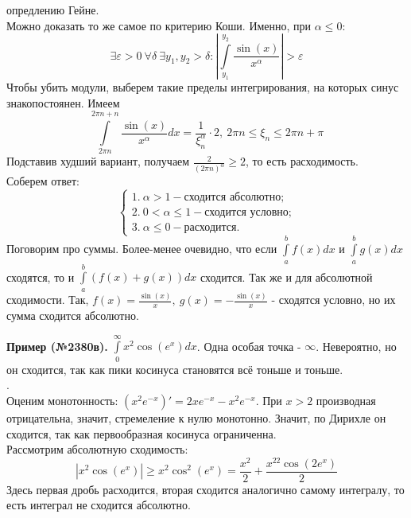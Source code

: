 опредлению Гейне.\\
Можно доказать то же самое по критерию Коши. Именно, при $\alpha\leqslant 0$:
$$\exists \varepsilon>0~\forall \delta~\exists y_1,y_2>\delta:
\left| \int\limits_{y_1}^{y_2} \frac{\sin(x)}{x^\alpha}\right|>
\varepsilon$$ 
Чтобы убить модули, выберем такие пределы интегрирования, на которых
синус знакопостоянен. Имеем 
$$\int\limits_{2\pi n}^{2\pi n+n} \frac{\sin(x)}{x^\alpha}dx=
\frac{1}{\xi^\alpha_n}\cdot 2,~2\pi n\leqslant \xi_n\leqslant 2\pi n+\pi$$
Подставив худший вариант, получаем $\frac{2}{(2\pi n)^\alpha}\geqslant 2$,
то есть расходимость.\\
Соберем ответ: 
$$\begin{cases}
    1.~ \alpha>1 - \text{сходится абсолютно;}\\
    2.~ 0<\alpha\leqslant 1 - \text{сходится условно;}\\
    3.~ \alpha\leqslant 0 - \text{расходится.}
\end{cases}$$
Поговорим про суммы. Более-менее очевидно, что если 
$\int\limits_{a}^{b}f(x)dx$ и $\int\limits_{a}^{b}g(x)dx$ сходятся, 
то и $\int\limits_{a}^{b}(f(x)+g(x))dx$ сходится. Так же и для абсолютной
сходимости. Так, $f(x)=\frac{\sin(x)}{x},~g(x)=-\frac{\sin(x)}{x}$ - сходятся 
условно, но их сумма сходится абсолютно. 

\textbf{Пример (№2380в).} $\int\limits_{0}^{\infty}x^2\cos(e^x)dx$. Одна 
особая точка - $\infty$. Невероятно, но он сходится, так как пики косинуса 
становятся всё тоньше и тоньше. \\
.\\
Оценим монотонность: $(x^2e^{-x})'=2xe^{-x}-x^2e^{-x}$. При  $x>2$ 
производная отрицательна, значит, стремеление к нулю монотонно. 
Значит, по Дирихле он сходится, так как первообразная косинуса ограниченна.\\
Рассмотрим абсолютную сходимость: 
$$|x^2\cos(e^x)|\geqslant x^2\cos^2(e^x)=\frac{x^2}{2}+
\frac{x^22\cos(2e^x)}{2}$$
Здесь первая дробь расходится, вторая сходится аналогично самому интегралу,
то есть интеграл не сходится абсолютно. 

